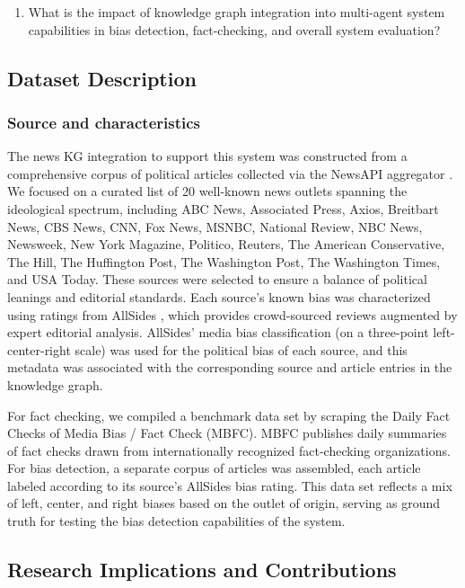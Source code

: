 \documentclass[11pt]{article}
\begin{document}
\begin{enumerate}
    \item What is the impact of knowledge graph integration into multi-agent system capabilities in bias detection, fact-checking, and overall system evaluation?
\end{enumerate}


\subsection{Dataset Description}
\subsubsection{Source and characteristics}

The news KG integration to support this system was constructed from a comprehensive corpus of political articles collected via the NewsAPI aggregator \cite{r15}. We focused on a curated list of 20 well-known news outlets spanning the ideological spectrum, including ABC News, Associated Press, Axios, Breitbart News, CBS News, CNN, Fox News, MSNBC, National Review, NBC News, Newsweek, New York Magazine, Politico, Reuters, The American Conservative, The Hill, The Huffington Post, The Washington Post, The Washington Times, and USA Today. These sources were selected to ensure a balance of political leanings and editorial standards. Each source’s known bias was characterized using ratings from AllSides \cite{r16}, which provides crowd-sourced reviews augmented by expert editorial analysis. AllSides’ media bias classification (on a three-point left-center-right scale) was used for the political bias of each source, and this metadata was associated with the corresponding source and article entries in the knowledge graph.

For fact checking, we compiled a benchmark data set by scraping the Daily Fact Checks of Media Bias / Fact Check (MBFC)\cite{r17}. MBFC publishes daily summaries of fact checks drawn from internationally recognized fact-checking organizations. For bias detection, a separate corpus of articles was assembled, each article labeled according to its source’s AllSides bias rating. This data set reflects a mix of left, center, and right biases based on the outlet of origin, serving as ground truth for testing the bias detection capabilities of the system. 



\subsection{Research Implications and Contributions}
\end{document}
